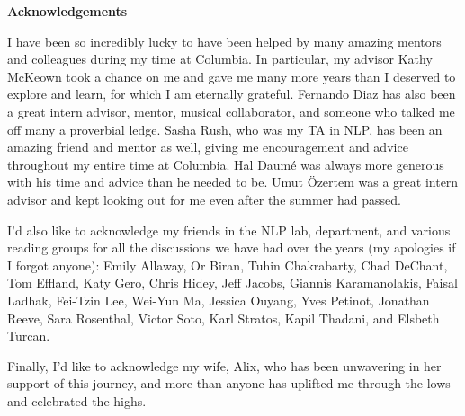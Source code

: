 
\clearpage
\begin{center}

\vspace*{5\baselineskip}
\textbf{\large Acknowledgements}
\end{center}
I have been so incredibly lucky to have been helped by many amazing mentors and colleagues during my time at Columbia.
In particular, my advisor Kathy McKeown took a chance on me and gave me many more years than I deserved to explore and learn, for which I am eternally grateful.
Fernando Diaz has also been a great intern advisor, mentor, musical collaborator, and someone who talked me off many a proverbial ledge.   
Sasha Rush, who was my TA in NLP, has been an amazing friend and mentor as well, giving me encouragement and advice throughout my entire time at Columbia.
Hal Daum{\'e} was always more generous with his time and advice than he needed to be.
Umut {\"O}zertem was a great intern advisor and kept looking out for me even after the summer had passed.

I'd also like to acknowledge my friends in the NLP lab, department, and various reading groups for all the discussions we have had over the years 
(my apologies if I forgot anyone): 
Emily Allaway,
Or Biran, 
Tuhin Chakrabarty, 
Chad DeChant,
Tom Effland, 
Katy Gero, 
Chris Hidey,
Jeff Jacobs,
Giannis Karamanolakis,
Faisal Ladhak,
Fei-Tzin Lee,
Wei-Yun Ma,
Jessica Ouyang,
Yves Petinot,
Jonathan Reeve,
Sara Rosenthal,
Victor Soto, 
Karl Stratos,
Kapil Thadani,
and
Elsbeth Turcan.

Finally, I'd like to acknowledge my wife, Alix, who has been unwavering in her support of this journey, and more than anyone has uplifted  me through the lows and celebrated the highs.


\begin{flushleft}
\hspace{10mm}
\end{flushleft}
\clearpage



